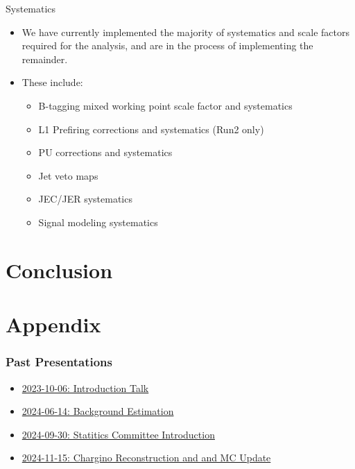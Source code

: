 \documentclass[]{beamer}
\begin{document}
\begin{frame}{Systematics}
  \begin{itemize}
  \item We have currently implemented the majority of systematics and scale factors required for the analysis, and are in the process of implementing the remainder.
  \item These include:
    \begin{itemize}
    \item B-tagging mixed working point scale factor and systematics
    \item L1 Prefiring corrections and systematics (Run2 only)
    \item PU corrections and systematics
    \item Jet veto maps
    \item JEC/JER systematics
    \item Signal modeling systematics
    \end{itemize}
  \end{itemize}
  
\end{frame}


\section{Conclusion}
\label{sec:conclusion}


\appendix

\section{Appendix}
\label{sec:appendix}


\begin{frame}[label={frame:past-presentations}]
  \frametitle{Past Presentations}
  \begin{itemize}
  \item \href{https://indico.cern.ch/event/1324384/\#2-rpv-single-top-squark-analys}{2023-10-06: Introduction Talk}
  \item \href{https://indico.cern.ch/event/1423342/\#6-rpv-single-stop-search-multi}{2024-06-14: Background Estimation}
  \item \href{https://indico.cern.ch/event/1459336/\#9-statistical-inquiry-on-non-p}{2024-09-30: Statitics Committee Introduction}
  \item \href{https://indico.cern.ch/event/1474513/\#5-update-to-rpv-single-top-squ}{2024-11-15: Chargino Reconstruction and and MC Update}
  \end{itemize}
\end{frame}
\end{document}
